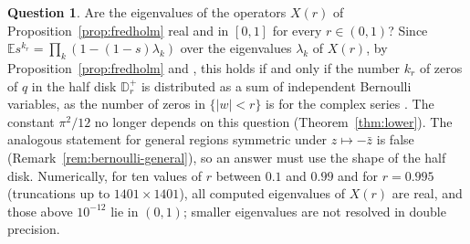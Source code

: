 \documentclass[11pt]{amsart}
\theoremstyle{definition}
\newtheorem{question}[theorem]{Question}
\theoremstyle{remark}
\numberwithin{equation}{section}
\newcommand{\D}{\mathbb{D}}
\newcommand{\E}{\mathbb{E}}
\begin{document}
\begin{question}\label{q:bernoulli}
Are the eigenvalues of the operators $X(r)$ of Proposition~\ref{prop:fredholm} real and in $[0,1]$ for every $r\in(0,1)$? Since $\E s^{k_r}=\prod_k(1-(1-s)\lambda_k)$ over the eigenvalues $\lambda_k$ of $X(r)$, by Proposition~\ref{prop:fredholm} and \cite[Theorem~14.44]{vN}, this holds if and only if the number $k_r$ of zeros of $q$ in the half disk $\D_r^+$ is distributed as a sum of independent Bernoulli variables, as the number of zeros in $\{|w|<r\}$ is for the complex series \cite{PV}. The constant $\pi^2/12$ no longer depends on this question (Theorem~\ref{thm:lower}). The analogous statement for general regions symmetric under $z\mapsto-\bar z$ is false (Remark~\ref{rem:bernoulli-general}), so an answer must use the shape of the half disk. Numerically, for ten values of $r$ between $0.1$ and $0.99$ and for $r=0.995$ (truncations up to $1401\times1401$), all computed eigenvalues of $X(r)$ are real, and those above $10^{-12}$ lie in $(0,1)$; smaller eigenvalues are not resolved in double precision.
\end{question}
\end{document}
